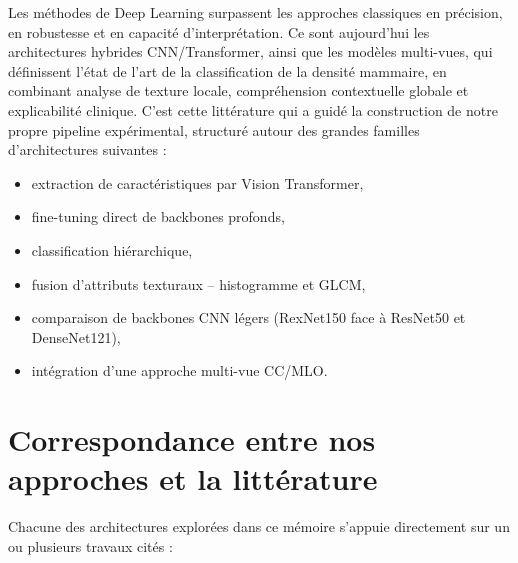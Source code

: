 \documentclass[12pt,a4paper]{report}
\begin{document}
Les méthodes de Deep Learning surpassent les
approches classiques en précision, en robustesse et en capacité
d'interprétation. Ce sont aujourd'hui les architectures hybrides
CNN/Transformer, ainsi que les modèles multi-vues, qui définissent l'état de
l'art de la classification de la densité mammaire, en combinant analyse de
texture locale, compréhension contextuelle globale et explicabilité
clinique. C'est cette littérature qui a guidé la construction de notre
propre pipeline expérimental, structuré autour des grandes familles
d'architectures suivantes :
\begin{itemize}
    \item extraction de caractéristiques par Vision Transformer,
    \item fine-tuning direct de backbones profonds,
    \item classification hiérarchique,
    \item fusion d'attributs texturaux -- histogramme et GLCM,
    \item comparaison de backbones CNN légers (RexNet150 face à ResNet50 et
    DenseNet121),
    \item intégration d'une approche multi-vue CC/MLO.
\end{itemize}

\section{Correspondance entre nos approches et la littérature}
\label{sec:correspondance}

Chacune des architectures explorées dans ce mémoire s'appuie directement sur
un ou plusieurs travaux cités :
\end{document}
